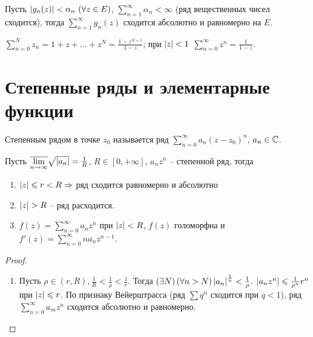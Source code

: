 \begin{theorem}
	Пусть $\mathopen{}\left\lvert g_n(z)\right\rvert\mathclose{} < \alpha_n \,\, (\forall z \in E)$, $\sum_{n = 1}^\infty \alpha_n < \infty$ (ряд вещественных чисел сходится), тогда $\sum_{n = 1}^\infty g_n(z)$ сходится абсолютно и равномерно на $E$.
\end{theorem}

\begin{proposition}
	$\sum_{n = 0}^N z_n = 1 + z + \ldots + z^N = \frac{1 - z^{N + 1}}{1 - z}$; при $\mathopen{}\left\lvert z\right\rvert\mathclose{} < 1$ $\sum_{n = 0}^\infty z^n = \frac{1}{1 - z}$. %
\end{proposition}

\section{Степенные ряды и элементарные функции}

\begin{definition}
	Степенным рядом в точке $z_0$ называется ряд $\sum_{n = 0}^\infty a_n {(z - z_0)}^n$, $a_n \in \mathbb{C}$.
\end{definition}

\begin{theorem}
	Пусть $\overline{\lim\limits_{n \to \infty}} \sqrt{\mathopen{}\left\lvert a_n\right\rvert\mathclose{}} = \frac{1}{R}$, $R \in [0, +\infty]$, $a_n z^n$ -- степенной ряд, тогда
	\begin{enumerate}
		\item $\mathopen{}\left\lvert z\right\rvert\mathclose{} \leqslant r < R \Rightarrow$ ряд сходится равномерно и абсолютно %
		\item $\mathopen{}\left\lvert z\right\rvert\mathclose{} > R$ -- ряд расходится.
		\item $f(z) = \sum_{n = 0}^\infty a_n z^n$ при $\mathopen{}\left\lvert z\right\rvert\mathclose{} < R$, $f(z)$ голоморфна и $f'(z) = \sum_{n = 0}^\infty n a_n z^{n - 1}$.
	\end{enumerate}
\end{theorem}

\begin{proof}
	\begin{enumerate}
		\item Пусть $\rho \in (r, R), \frac{1}{R} < \frac{1}{\rho} < \frac{1}{r}$. Тогда $(\exists N) \, (\forall n > N) \, {\mathopen{}\left\lvert a_n\right\rvert\mathclose{}}^{\frac{1}{n}} < \frac{1}{\rho}$. $\mathopen{}\left\lvert a_n z^n\right\rvert\mathclose{} \leqslant \frac{1}{\rho^n} r^n$ при $\mathopen{}\left\lvert z\right\rvert\mathclose{} \leqslant r$. По признаку Вейерштрасса (ряд $\sum q^n$ сходится при $q < 1$), ряд $\sum_{n = 0}^\infty a_m z^n$ сходится абсолютно и равномерно. %
	\end{enumerate}
\end{proof}
